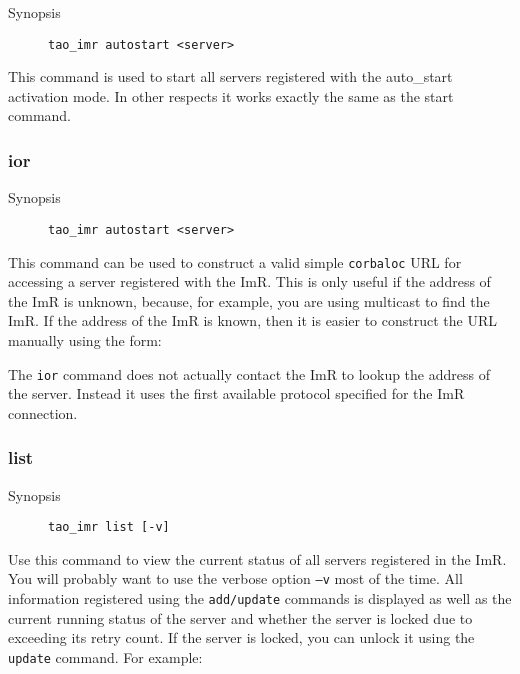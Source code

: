\begin{description}
    \item [Synopsis] {\tt tao\_imr autostart <server>}
\end{description}

This command is used to start all servers registered with the auto\_start
activation mode. In other respects it works exactly the same as the
start command.

\subsubsection{ior}

\begin{description}
    \item [Synopsis] {\tt tao\_imr autostart <server>}
\end{description}

This command can be used to construct a valid simple {\tt corbaloc} URL
for accessing a server registered with the ImR. This is only useful if the
address of the ImR is unknown, because, for example, you are using multicast
to find the ImR.  If the address of the ImR is known, then it is easier to construct
the URL manually using the form:


The {\tt ior} command does not actually contact the ImR to lookup the address
of the server. Instead it uses the first available protocol specified for the
ImR connection.

\subsubsection{list}

\begin{description}
    \item [Synopsis] {\tt tao\_imr list [-v]}
\end{description}

Use this command to view the current status of all servers registered
in the ImR. You will probably want to use the verbose option {\tt–v}
 most of the time. All information registered using the {\tt add/update}
commands is displayed as well as the current running status of the
server and whether the server is locked due to exceeding its retry count.
If the server is locked, you can unlock it using the {\tt update} command.
For example:


